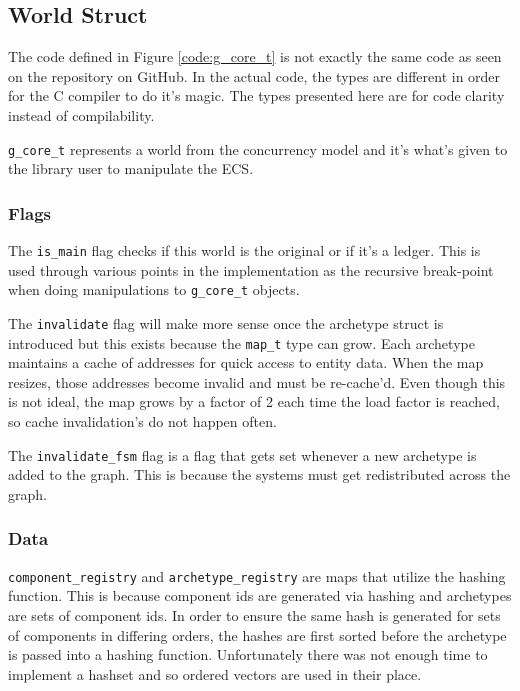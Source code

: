 \subsection{World Struct}
The code defined in Figure \ref{code:g_core_t} is not exactly the same code as seen on the repository on GitHub. In the actual code, the types are different in order for the C compiler to do it's magic. The types presented here are for code clarity instead of compilability.

\texttt{g\_core\_t} represents a world from the concurrency model and it's what's given to the library user to manipulate the ECS.

\subsubsection{Flags}
The \texttt{is\_main} flag checks if this world is the original or if it's a ledger. This is used through various points in the implementation as the recursive break-point when doing manipulations to \texttt{g\_core\_t} objects. 

The \texttt{invalidate} flag will make more sense once the archetype struct is introduced but this exists because the \texttt{map\_t} type can grow. Each archetype maintains a cache of addresses for quick access to entity data. When the map resizes, those addresses become invalid and must be re-cache'd. Even though this is not ideal, the map grows by a factor of 2 each time the load factor is reached, so cache invalidation's do not happen often. 

The \texttt{invalidate\_fsm} flag is a flag that gets set whenever a new archetype is added to the graph. This is because the systems must get redistributed across the graph.

\subsubsection{Data}
\texttt{component\_registry} and \texttt{archetype\_registry} are maps that utilize the hashing function. This is because component ids are generated via hashing and archetypes are sets of component ids. In order to ensure the same hash is generated for sets of components in differing orders, the hashes are first sorted before the archetype is passed into a hashing function. Unfortunately there was not enough time to implement a hashset and so ordered vectors are used in their place.

